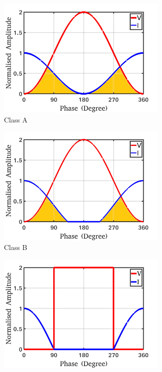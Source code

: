 \documentclass[conference]{IEEEtran}
\begin{document}
\begin{figure}[!t]
\centering
\captionsetup{font=footnotesize}
\begin{subfigure}{0.24\textwidth}
\includegraphics[width=0.9\textwidth]{Images/Intro/ClassA_shaded.jpg}
\caption{Class A}
\label{fig:CA_wave_VI}
\end{subfigure}
\begin{subfigure}{0.24\textwidth}
\includegraphics[width=0.9\textwidth]{Images/Intro/ClassB_shaded.jpg}
\caption{Class B}
\label{fig:CB_wave_VI}
\end{subfigure}
\begin{subfigure}{0.24\textwidth}
\includegraphics[width=0.9\textwidth]{Images/Intro/ClassF.jpg}

\end{subfigure}
\end{figure}
\end{document}
